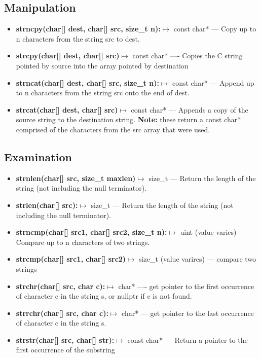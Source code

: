 \documentclass{report}
\begin{document}
    \subsection{Manipulation}
    \begin{itemize}
        \item \textbf{strncpy(char[] dest, char[] src, size\_t n):}$\mapsto$ const char* --- Copy up to n characters from the string src to dest.
        \item \textbf{strcpy(char[] dest, char[] src)}$\mapsto$ const char* ---- Copies the C string pointed by source into the array pointed by destination
        \item \textbf{strncat(char[] dest, char[] src, size\_t n):}$\mapsto$ const char* --- Append up to n characters from the string src onto the end of dest.
        \item \textbf{strcat(char[] dest, char[] src)}$\mapsto$ const char* --- Appends a copy of the source string to the destination string.
        \bigbreak \noindent 
        \textbf{Note:} these return a const char* comprised of the characters from the src array that were used.
    \end{itemize}

    \bigbreak \noindent 
    \subsection{Examination}
    \begin{itemize}
        \item \textbf{strnlen(char[] src, size\_t maxlen)}$\mapsto$ size\_t --- Return the length of the string (not including the null terminator).
        \item \textbf{strlen(char[] src):}$\mapsto$ size\_t --- Return the length of the string (not including the null terminator).
        \item \textbf{strncmp(char[] src1, char[] src2, size\_t n):}$\mapsto$ uint (value varies) --- Compare up to n characters of two strings.
        \item \textbf{strcmp(char[] src1, char[] src2)}$\mapsto$ size\_t (value varires) --- compare two strings
        \item \textbf{strchr(char[] src, char c):}$\mapsto$ char* ---- get pointer to the first occurrence of character c in the string s, or nullptr if c is not found.
        \item \textbf{strrchr(char[] src, char c):}$\mapsto$ char* --- get pointer to the last occurrence of character c in the string s.
        \item \textbf{strstr(char[] src, char[] str):}$\mapsto$ const char* --- Return a pointer to the first occurrence of the substring 
    \end{itemize}
\end{document}
